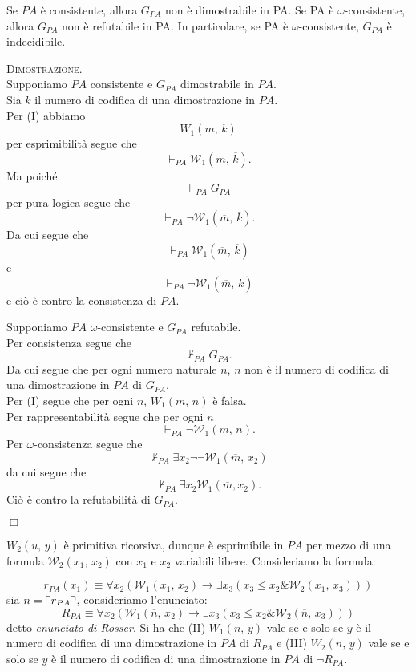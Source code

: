 	\begin{thm}
	Se $PA$ \`e consistente, allora $G_{PA}$ non \`e
	dimostrabile in PA. Se PA \`e $\omega$-consistente,
	allora $G_{PA}$ non \`e refutabile in PA. In
	particolare, se PA \`e $\omega$-consistente, $G_{PA}$
	\`e indecidibile.
	\end{thm}
	
	\textsc{Dimostrazione.}\\
	Supponiamo $PA$ consistente e $G_{PA}$ dimostrabile in $PA$.\\
	Sia $k$ il numero di codifica di una dimostrazione in $PA$.\\
	Per (I) abbiamo
		$$W_1(m,\,k)$$
	per esprimibilit\`a segue che
		$$\vdash_{PA} \mathcal{W}_1(\overline{m},\,\overline{k}).$$
	Ma poich\'e 
		$$\vdash_{PA}G_{PA}$$
	per pura logica segue che
		$$\vdash_{PA}\neg\mathcal{W}_1(\overline{m},\,\overline{k}).$$
	Da cui segue che 
		$$\vdash_{PA}\mathcal{W}_1(\overline{m},\,\overline{k})$$
	e
		$$\vdash_{PA}\neg\mathcal{W}_1(\overline{m},\,\overline{k})$$
	e ci\`o \`e contro la consistenza di $PA$.
	
	Supponiamo $PA$ $\omega$-consistente e $G_{PA}$ refutabile.\\
	Per consistenza segue che
		$$\not\vdash_{PA} G_{PA}.$$
	Da cui segue che per ogni numero naturale $n$, $n$ non \`e il numero di codifica di
	una dimostrazione in $PA$ di $G_{PA}$.\\
	Per (I) segue che per ogni $n$, $W_1(m,\,n)$ \`e falsa.\\
	Per rappresentabilit\`a segue che per ogni $n$
		$$\vdash_{PA}\neg\mathcal{W}_1(\overline{m},\,\overline{n}).$$
	Per $\omega$-consistenza segue che
		$$\not\vdash_{PA}\exists x_2\neg\neg \mathcal{W}_1(\overline{m},\,x_2)$$
	da cui segue che
	$$\not\vdash_{PA}\exists x_2\mathcal{W}_1(\overline{m},x_2).$$
	Ci\`o \`e contro la refutabilit\`a di $G_{PA}$.
	\begin{flushright}$\Box$\end{flushright}
	
	$W_2(u,\,y)$ \`e primitiva ricorsiva, dunque \`e esprimibile in $PA$ per mezzo
	di una formula $\mathcal{W}_2(x_1,\,x_2)$ con $x_1$ e $x_2$ variabili libere.
	Consideriamo la formula:
	
	$$
	r_{PA}(x_1)\equiv
	\forall x_2(\mathcal{W}_1(x_1,\,x_2)\rightarrow
	\exists x_3(x_3\leq x_2\& \mathcal{W}_2(x_1,\,x_3)))
	$$
	sia $n=\ulcorner r_{PA} \urcorner$, consideriamo l'enunciato:
	$$
	R_{PA}\equiv
	\forall x_2(\mathcal{W}_1(\overline{n},\,x_2)\rightarrow
	\exists x_3(x_3\leq x_2\& \mathcal{W}_2(\overline{n},\,x_3)))
	$$
	detto \emph{enunciato di Rosser}. Si ha che
	(II) $W_1(n,\,y)$ vale se e solo se $y$ \`e il numero di codifica
	di una dimostrazione in $PA$ di $R_{PA}$ e (III)
	$W_2(n,\,y)$ vale se e solo se $y$ \`e il numero di codifica
	di una dimostrazione in $PA$ di $\neg R_{PA}$.
	
